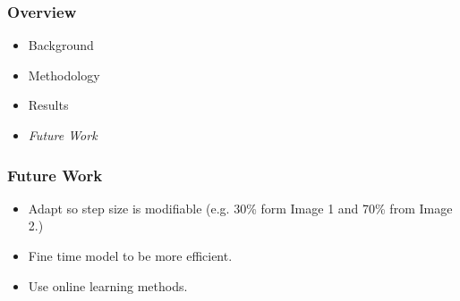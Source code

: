 \begin{frame}
\frametitle{Overview}
    \begin{itemize}
        \item Background
        \item Methodology 
        \item Results
        \item \emph{\color{UOYellow}Future Work}
    \end{itemize}
\end{frame}

\begin{frame}
\frametitle{Future Work}
    \begin{itemize}
        \item Adapt so step size is modifiable (e.g. 30\% form Image 1 and 70\%
                from Image 2.)
        \item Fine time model to be more efficient.
        \item Use online learning methods.
    \end{itemize}
\end{frame}
